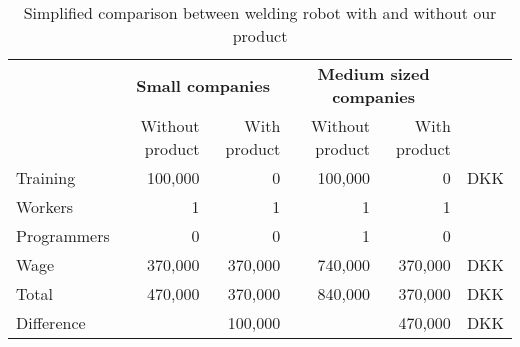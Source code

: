 \begin{table}[h!]
\centering
\begin{tabular}{l r r | r r r}
& \multicolumn{2}{c}{\textbf{Small companies}} & \multicolumn{2}{c}{\textbf{Medium sized companies}} & \\ 
                        & Without product & With product & Without product & With product & \\
\hline
Training                & 100,000         & 0            & 100,000         & 0            &  DKK\\
Workers                 & 1               & 1            & 1               & 1            &    \\
Programmers             & 0               & 0            & 1               & 0            &    \\
Wage                    & 370,000         & 370,000      & 740,000         & 370,000      & DKK	 \\
Total                   & 470,000         & 370,000      & 840,000         & 370,000      & DKK\\
\hline                                                                     
Difference              &                 & 100,000      &                 & 470,000      & DKK\\
\end{tabular}
\caption{Simplified comparison between welding robot with and without our product}
\label{weld-example}
\end{table}


